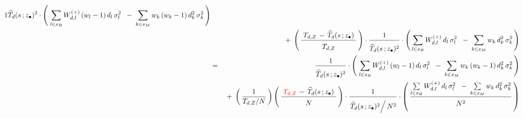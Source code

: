 \begin{lemma}
\begin{enumerate}
\begin{eqnarray*}
{            1
            }{
            \overset{{\color{white}.}}{
                \widehat{T}_{d}(s\,;\zdot)^{2}
                }
            }
        \cdot
        \left(\;
            \underset{l \in s_{R}}{\sum}\,
            W^{(+)}_{d,l}\,(w_{l}-1)\,d_{l}\,\sigma_{l}^{2}
            \;\;-\;
            \underset{k \in s_{M}}{\sum}\,
            w_{k}\,(w_{k}-1)\,d_{k}^{2}\,\sigma_{k}^{2}
            \,\right)
    \\
    &&
        \; + \;
        \left(\,
            \dfrac{
                {\color{white}.}
                {\color{black}T_{d,Z}} \,-\, \widehat{T}_{d}(s\,;\zdot)
                {\color{white}.}
                }{
                \overset{{\color{white}.}}{
                    T_{d,Z}
                    }
                }           
            \,\right)
        \cdot
        \dfrac{
            1
            }{
            \overset{{\color{white}.}}{
                \widehat{T}_{d}(s\,;\zdot)^{2}
                }
            }
        \cdot
        \left(\,
            \underset{l \in s_{R}}{\sum}\,
            W^{(+)}_{d,l}\,d_{l}\,\sigma_{l}^{2}
            \;\;-\;
            \underset{k \in s_{M}}{\sum}\,
            w_{k}\,d_{k}^{2}\,\sigma_{k}^{2}
            \,\right)
    \\
    & = &
        \dfrac{
            1
            }{
            \overset{{\color{white}.}}{
                \widehat{T}_{d}(s\,;\zdot)^{2}
                }
            }
        \cdot
        \left(\;
            \underset{l \in s_{R}}{\sum}\,
            W^{(+)}_{d,l}\,(w_{l}-1)\,d_{l}\,\sigma_{l}^{2}
            \;\;-\;
            \underset{k \in s_{M}}{\sum}\,
            w_{k}\,(w_{k}-1)\,d_{k}^{2}\,\sigma_{k}^{2}
            \,\right)
    \\
    &&
        \; + \;
        \left(\,
            \dfrac{1}{T_{d,Z} \slash N}
            \,\right)
        \left(\,
            \dfrac{
                {\color{white}.}
                {\color{red}T_{d,Z}} \,-\, \widehat{T}_{d}(s\,;\zdot)
                {\color{white}.}
                }{
                \overset{{\color{white}.}}{
                    N
                    }
                }           
            \,\right)
        \cdot
        \dfrac{
            1
            }{
            \overset{{\color{white}.}}{
                \left. \widehat{T}_{d}(s\,;\zdot)^{2} \right\slash N^{2}
                }
            }
        \cdot
        \left(\,
            \dfrac{
                \underset{l \in s_{R}}{\sum}\,
                W^{(+)}_{d,l}\,d_{l}\,\sigma_{l}^{2}
                \;\;-\;
                \underset{k \in s_{M}}{\sum}\,
                w_{k}\,d_{k}^{2}\,\sigma_{k}^{2}
                }{
                \overset{{\color{white}.}}{N^{2}}                
                }
            \,\right)
    \end{eqnarray*}
\end{enumerate}
\end{lemma}

